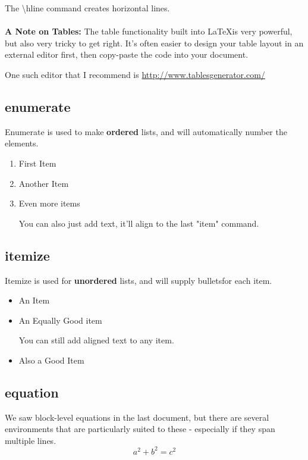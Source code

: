 \documentclass{article}
\begin{document}
        The \textbackslash hline command creates horizontal lines. \\\\

        \textbf{A Note on Tables:} The table functionality built into \LaTeX is very powerful, but also very tricky to get right. It's often easier to design your table layout in an external editor first, then copy-paste the code into your document.

        One such editor that I recommend is \url{http://www.tablesgenerator.com/}

    \subsection{enumerate}
        Enumerate is used to make \textbf{ordered} lists, and will automatically number the elements.

        \begin{enumerate}
          \item First Item
          \item Another Item
          \item Even more items

          You can also just add text, it'll align to the last "item" command.
        \end{enumerate}

    \subsection{itemize}
        Itemize is used for \textbf{unordered} lists, and will supply bulletsfor each item.

        \begin{itemize}
          \item An Item
          \item An Equally Good item

            You can still add aligned text to any item.

          \item Also a Good Item

        \end{itemize}

    \subsection{equation}
        We saw block-level equations in the last document, but there are several environments that are particularly suited to these - especially if they span multiple lines.
        \begin{equation}
            a^2 + b^2 = c^2
            \label{eq:pythagoras} %
        \end{equation}
\end{document}
